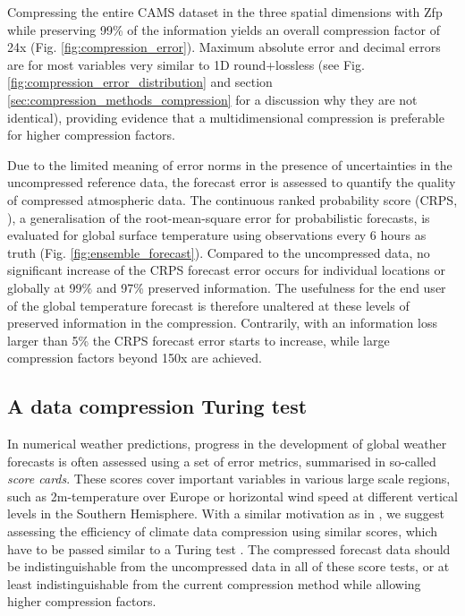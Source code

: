 Compressing the entire CAMS dataset in the three spatial dimensions with Zfp while preserving 99\% of the information yields
an overall compression factor of 24x (Fig. \ref{fig:compression_error}). Maximum absolute error and decimal errors are for
most variables very similar to 1D round+lossless (see Fig. \ref{fig:compression_error_distribution} and section
\ref{sec:compression_methods_compression} for a discussion why they are not identical), providing evidence that a
multidimensional compression is preferable for higher compression factors. 

Due to the limited meaning of error norms in the presence of uncertainties in the uncompressed reference data, the forecast
error is assessed to quantify the quality of compressed atmospheric data. The continuous ranked probability score
(CRPS, \cite{Matheson1976,Hersbach2000,Zamo2018}),
a generalisation of the root-mean-square error for probabilistic forecasts, is evaluated for global surface temperature using observations
every 6 hours as truth (Fig. \ref{fig:ensemble_forecast}). Compared to the uncompressed data, no significant increase of the CRPS forecast error 
occurs for individual locations or globally at 99\% and 97\% preserved information. The usefulness for the end user of the global temperature
forecast is therefore unaltered at these levels of preserved information in the compression. Contrarily, with an information loss larger than
5\% the CRPS forecast error starts to increase, while large compression factors beyond 150x are achieved.

\subsection{A data compression Turing test}

In numerical weather predictions, progress in the development of global weather forecasts is often assessed using a set of error metrics,
summarised in so-called \emph{score cards}. These scores cover important variables in various large scale regions, such as 2m-temperature
over Europe or horizontal wind speed at different vertical levels in the Southern Hemisphere. With a similar motivation as in \cite{Baker2019},
we suggest assessing the efficiency of climate data compression using similar scores, which have to be passed similar to a Turing test
\citep{Baker2016,Turing1950}.
The compressed forecast data should be indistinguishable from the uncompressed data in all of these score tests, or at least indistinguishable
from the current compression method while allowing higher compression factors. 

